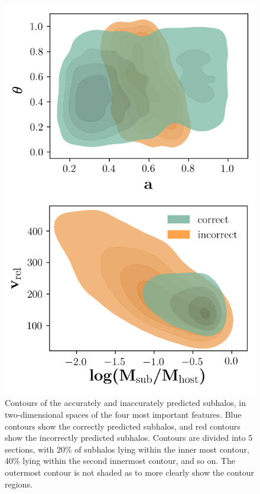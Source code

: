 \documentclass[fleqn,usenatbib]{mnras}
\begin{document}
\begin{figure}
	\includegraphics[width=\columnwidth]{Figures/survival_contours}
	\vspace{-20pt}
    \caption{Contours of the accurately and inaccurately predicted subhalos, in two-dimensional spaces of the four most important features. Blue contours show the correctly predicted subhalos, and red contours show the incorrectly predicted subhalos. Contours are divided into 5 sections, with 20\% of subhalos lying within the inner most contour, 40\% lying within the second innermost contour, and so on. The outermost contour is not shaded as to more clearly show the contour regions.}
    \label{fig:survival_contours}
\end{figure}
\end{document}
